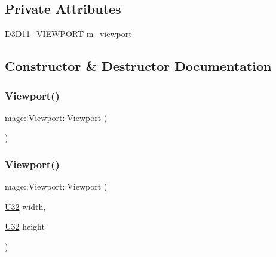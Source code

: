 \subsection*{Private Attributes}
\begin{DoxyCompactItemize}
\item 
D3\+D11\+\_\+\+V\+I\+E\+W\+P\+O\+RT \hyperlink{classmage_1_1_viewport_a9509003aae2c6cd0f33cfc875cd235f4}{m\+\_\+viewport}
\end{DoxyCompactItemize}


\subsection{Constructor \& Destructor Documentation}
\hypertarget{classmage_1_1_viewport_ab189482e477d46a63c514f59e09ca31b}{}\label{classmage_1_1_viewport_ab189482e477d46a63c514f59e09ca31b} 
\subsubsection{\texorpdfstring{Viewport()}{Viewport()}\hspace{0.1cm}{\footnotesize\ttfamily [1/11]}}
{\footnotesize\ttfamily mage\+::\+Viewport\+::\+Viewport (\begin{DoxyParamCaption}{ }\end{DoxyParamCaption})}

\hypertarget{classmage_1_1_viewport_af9a0c9e372658819d15547818c90d924}{}\label{classmage_1_1_viewport_af9a0c9e372658819d15547818c90d924} 
\subsubsection{\texorpdfstring{Viewport()}{Viewport()}\hspace{0.1cm}{\footnotesize\ttfamily [2/11]}}
{\footnotesize\ttfamily mage\+::\+Viewport\+::\+Viewport (\begin{DoxyParamCaption}\item[{\hyperlink{namespacemage_a41c104c036fba3756a74e19f793eeaa1}{U32}}]{width,  }\item[{\hyperlink{namespacemage_a41c104c036fba3756a74e19f793eeaa1}{U32}}]{height }\end{DoxyParamCaption})\hspace{0.3cm}{\ttfamily [explicit]}}

